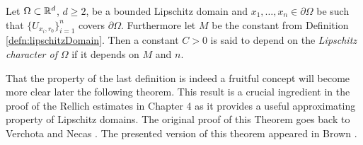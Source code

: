  \begin{defn}
    Let $\Omega \subset \mathbb{R}^d$, $d \geq 2$, be a bounded Lipschitz domain and $x_1, \dots,x_n \in \partial\Omega$ be such that $\{U_{x_i,r_0} \}_{i = 1}^n$ covers $\partial\Omega$.  
    Furthermore let $M$ be the constant from Definition \ref{defn:lipschitzDomain}.
    Then a constant $C > 0$ is said to depend on the \emph{Lipschitz character of} $\Omega$ if it depends on $M$ and $n$.
  \end{defn}

  That the property of the last definition is indeed a fruitful concept will become more clear later the following theorem.
  This result is a crucial ingredient in the proof of the Rellich estimates in Chapter 4 as it provides a useful approximating property of Lipschitz domains.
  The original proof of this Theorem goes back to Verchota \cite{verchota} and Necas \cite{necas}. 
  The presented version of this theorem appeared in Brown \cite{brown}.

